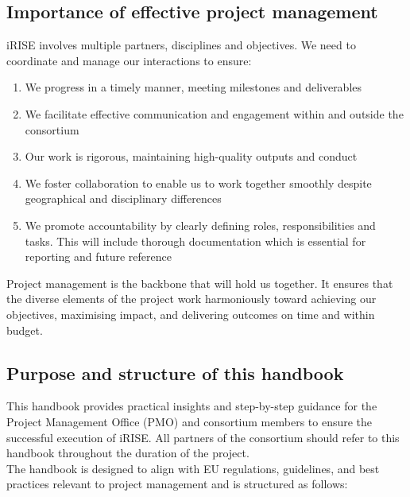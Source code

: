 \documentclass[
]{article}
\providecommand{\tightlist}{%
  \setlength{\itemsep}{0pt}\setlength{\parskip}{0pt}}
\begin{document}
\hypertarget{importance-of-effective-project-management}{%
\subsection{Importance of effective project management}\label{importance-of-effective-project-management}}

iRISE involves multiple partners, disciplines and objectives. We need to coordinate and manage our interactions to ensure:

\begin{enumerate}
\def\labelenumi{\arabic{enumi}.}
\tightlist
\item
  We progress in a timely manner, meeting milestones and deliverables\\
\item
  We facilitate effective communication and engagement within and outside the consortium\\
\item
  Our work is rigorous, maintaining high-quality outputs and conduct\\
\item
  We foster collaboration to enable us to work together smoothly despite geographical and disciplinary differences\\
\item
  We promote accountability by clearly defining roles, responsibilities and tasks. This will include thorough documentation which is essential for reporting and future reference
\end{enumerate}

Project management is the backbone that will hold us together. It ensures that the diverse elements of the project work harmoniously toward achieving our objectives, maximising impact, and delivering outcomes on time and within budget.

\hypertarget{purpose-and-structure-of-this-handbook}{%
\subsection{Purpose and structure of this handbook}\label{purpose-and-structure-of-this-handbook}}

This handbook provides practical insights and step-by-step guidance for the Project Management Office (PMO) and consortium members to ensure the successful execution of iRISE. All partners of the consortium should refer to this handbook throughout the duration of the project.\\
The handbook is designed to align with EU regulations, guidelines, and best practices relevant to project management and is structured as follows:
\end{document}

